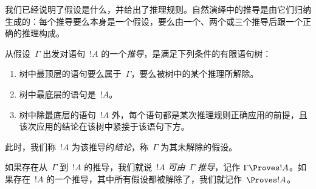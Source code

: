 \documentclass[../../../include/open-logic-section]{subfiles}
\begin{document}
      {}
      {}


\begin{explain}
我们已经说明了假设是什么，并给出了推理规则。自然演绎中的推导是由它们归纳生成的：每个推导要么本身是一个假设，要么由一个、两个或三个推导后跟一个正确的推理构成。
\end{explain}

\begin{defn}[推导]
 从假设~$\Gamma$ 出发对语句~$!A$ 的一个\emph{推导}，是满足下列条件的有限语句树：
\begin{enumerate}
\item 树中最顶层的语句要么属于~$\Gamma$，要么被树中的某个推理所解除。
\item 树中最底层的语句是~$!A$。
\item 树中除最底层的语句~$!A$ 外，每个语句都是某次推理规则正确应用的前提，且该次应用的结论在该树中紧接于该语句下方。
\end{enumerate}
此时，我们称~$!A$ 为该推导的\emph{结论}，称~$\Gamma$ 为其未解除的假设。

如果存在从~$\Gamma$ 到~$!A$ 的推导，我们就说~$!A$ \emph{可由~$\Gamma$ 推导}，记作 $\Gamma \Proves !A$。如果存在~$!A$ 的一个推导，其中所有假设都被解除了，我们就记作~$\Proves !A$。
\end{defn}
\end{document}
